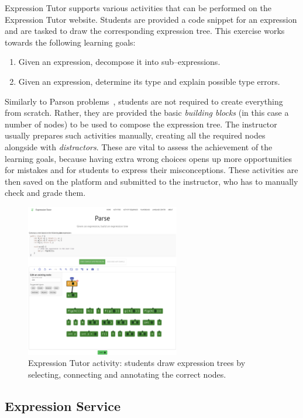 \begin{chapterBody}
Expression Tutor supports various activities that can be performed on
the Expression Tutor website.
Students are provided a code snippet for an expression and are tasked to
draw the corresponding expression tree. This exercise works towards the 
following learning goals:

\begin{enumerate}
    \item Given an expression, decompose it into sub–expressions.
    \item Given an expression, determine its type and explain possible
type errors.
\end{enumerate}

Similarly to Parson problems~\cite{parsons_parsons_2006}, students are
not required to create everything from scratch. Rather, they are provided
the basic \textit{building blocks} (in this case a number of nodes) to be
used to compose the expression tree.
The instructor usually prepares such activities manually, creating all the
required nodes alongside with \textit{distractors}. These are vital to
assess the achievement of the learning goals, because having extra wrong
choices opens up more opportunities for mistakes and for students to express
their misconceptions.
These activities are then saved on the platform and submitted to the instructor,
who has to manually check and grade them.

\begin{figure}[ht]
    \centering
    \includegraphics[width=0.6\textwidth]{res/2/et_parse_activity.png}
    \caption{Expression Tutor activity: students draw expression trees by 
selecting, connecting and annotating the correct nodes.}
    \label{fig:bg-et-activity}
\end{figure}

\subsection{Expression Service}\label{sec:bg-rw-le-et-es}


\end{chapterBody}
